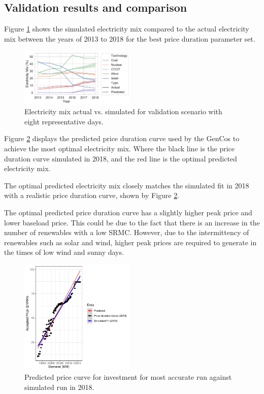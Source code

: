 \documentclass[final,3p,times,twocolumn,numbers]{elsarticle}
\begin{document}
\subsection{Validation results and comparison}


Figure \ref{fig:actual_vs_simulated_validation} shows the simulated electricity mix compared to the actual electricity mix between the years of 2013 to 2018 for the best price duration parameter set.


\begin{figure}
\centering
\includegraphics[width=0.49\textwidth]{figures/results/throughout_years.pdf}
\caption{Electricity mix actual vs. simulated for validation scenario with eight representative days.}
\label{fig:actual_vs_simulated_validation}
\end{figure}


Figure \ref{fig:best_price_curve} displays the predicted price duration curve used by the GenCos to achieve the most optimal electricity mix. Where the black line is the price duration curve simulated in 2018, and the red line is the optimal predicted electricity mix. 

The optimal predicted electricity mix closely matches the simulated fit in 2018 with a realistic price duration curve, shown by Figure \ref{fig:best_price_curve}.

The optimal predicted price duration curve has a slightly higher peak price and lower baseload price. This could be due to the fact that there is an increase in the number of renewables with a low SRMC. However, due to the intermittency of renewables such as solar and wind, higher peak prices are required to generate in the times of low wind and sunny days.

\begin{figure}
\centering
\includegraphics[width=0.49\textwidth]{figures/results/best_run_price_dur_curve.pdf}
\caption{Predicted price curve for investment for most accurate run against simulated run in 2018.}
\label{fig:best_price_curve}
\end{figure}
\end{document}
